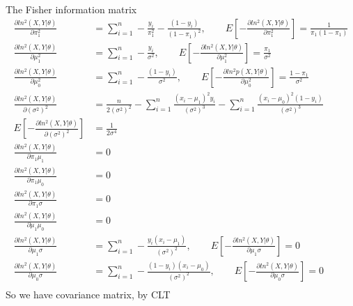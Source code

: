 \documentclass[11pt]{article} %
\begin{document}
	The Fisher information matrix 
	\begin{align*}
		\frac{\partial ln^2 (X, Y|\theta)}{\partial \pi_1^2}  &= \sum_{i=1}^n -\frac{y_i}{\pi_1^2} - \frac{(1-y_i)}{(1-\pi_1)^2} , \qquad E[-\frac{\partial ln^2(X, Y|\theta)}{\partial \pi_1^2}] =  \frac{1}{\pi_1(1-\pi_1)}\\
		\frac{\partial ln^2 (X, Y|\theta)}{\partial \mu_1^2}  &= \sum_{i=1}^n -\frac{y_i}{\sigma^2}, \qquad E[-\frac{\partial ln^2 (X, Y|\theta)}{\partial \mu_1^2} ]= \frac{\pi_1}{\sigma^2}\\
		\frac{\partial ln^2 (X, Y|\theta)}{\partial \mu_0^2}  &= \sum_{i=1}^n -\frac{(1-y_i)}{\sigma^2}, \qquad E[- \frac{\partial ln^2 p(X, Y|\theta)}{\partial \mu_0^2}] = \frac{1-\pi_1}{\sigma^2}\\
		\frac{\partial ln^2 (X, Y|\theta)}{\partial (\sigma^2)^2}  &= \frac{n}{2 (\sigma^2)^2} - \sum_{i=1}^n \frac{(x_i-\mu_1)^2y_i}{(\sigma^2)^3} - \sum_{i=1}^n \frac{(x_i-\mu_0)^2(1-y_i)}{(\sigma^2)^3}\\
		E[-\frac{\partial ln^2 (X, Y|\theta)}{\partial (\sigma^2)^2}] &= \frac{1}{2\sigma^4} \\
		\frac{\partial ln^2 (X, Y|\theta)}{\partial \pi_1\mu_1}  &=0\\
		\frac{\partial ln^2 (X, Y|\theta)}{\partial \pi_1\mu_0}  &=0\\
		\frac{\partial ln^2 (X, Y|\theta)}{\partial \pi_1\sigma}  &=0\\
		\frac{\partial ln^2 (X, Y|\theta)}{\partial \mu_1\mu_0}  &=0\\
		\frac{\partial ln^2 (X, Y|\theta)}{\partial \mu_1\sigma}  &= \sum_{i=1}^n - \frac{y_i(x_i-\mu_1)}{(\sigma^2)^2} , \qquad E[-\frac{\partial ln^2 (X, Y|\theta)}{\partial \mu_1\sigma}] = 0  \\
		\frac{\partial ln^2 (X, Y|\theta)}{\partial \mu_0\sigma}  &= \sum_{i=1}^n - \frac{(1-y_i)(x_i-\mu_0)}{(\sigma^2)^2} , \qquad E[-\frac{\partial ln^2 (X, Y|\theta)}{\partial \mu_0\sigma}] = 0 \\
	\end{align*} 
	So we have covariance matrix, by CLT
\end{document}
